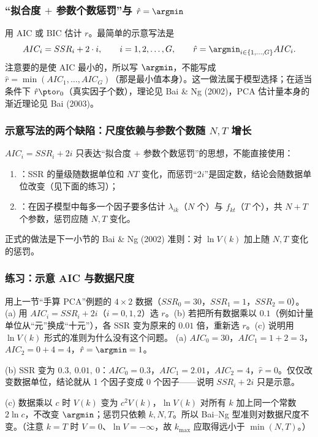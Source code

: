 \subsubsection{“拟合度 \texorpdfstring{$+$}{+} 参数个数惩罚”与 \texorpdfstring{$\hat r=\argmin$}{r-hat = argmin}}

用 AIC 或 BIC 估计 $r$。最简单的示意写法是
\[
AIC_i=SSR_i+2\cdot i,\qquad i=1,2,\dots,G,\qquad
\hat r=\argmin_{i\in\{1,\dots,G\}}AIC_i .
\]
注意要的是使 AIC 最小的，所以写 $\argmin$，不能写成 $\hat r=\min(AIC_1,\dots,AIC_G)$（那是最小值本身）。这一做法属于模型选择；在适当条件下 $\hat r\pto r_0$（真实因子个数），理论见 Bai \& Ng (2002)，PCA 估计量本身的渐近理论见 Bai (2003)。

\subsubsection{示意写法的两个缺陷：尺度依赖与参数个数随 \texorpdfstring{$N,T$}{N,T} 增长}

$AIC_i=SSR_i+2i$ 只表达“拟合度 $+$ 参数个数惩罚”的思想，不能直接使用：
\begin{enumerate}
\item {}：SSR 的量级随数据单位和 $NT$ 变化，而惩罚“$2i$”是固定数，结论会随数据单位改变（见下面的练习）；
\item {}：在因子模型中每多一个因子要多估计 $\lambda_{ik}$（$N$ 个）与 $f_{kt}$（$T$ 个），共 $N+T$ 个参数，惩罚应随 $N,T$ 变化。
\end{enumerate}
正式的做法是下一小节的 Bai \& Ng (2002) 准则：对 $\ln V(k)$ 加上随 $N,T$ 变化的惩罚。

\subsubsection{练习：示意 AIC 与数据尺度}

\begin{prac}\label{pr:U13b-aicscale}
用上一节“手算 PCA”例题的 $4\times2$ 数据（$SSR_0=30$，$SSR_1=1$，$SSR_2=0$）。(a) 用 $AIC_i=SSR_i+2i$（$i=0,1,2$）选 $r$。(b) 若把所有数据乘以 $0.1$（例如计量单位从“元”换成“十元”），各 SSR 变为原来的 $0.01$ 倍，重新选 $r$。(c) 说明用 $\ln V(k)$ 形式的准则为什么没有这个问题。
\answer
(a) $AIC_0=30$，$AIC_1=1+2=3$，$AIC_2=0+4=4$，$\hat r=\argmin=1$。

(b) SSR 变为 $0.3,\ 0.01,\ 0$：$AIC_0=0.3$，$AIC_1=2.01$，$AIC_2=4$，$\hat r=0$。仅仅改变数据单位，结论就从 1 个因子变成 0 个因子——说明 $SSR_i+2i$ 只是示意。

(c) 数据乘以 $c$ 时 $V(k)$ 变为 $c^2V(k)$，$\ln V(k)$ 对所有 $k$ 加上同一个常数 $2\ln c$，不改变 $\argmin$；惩罚只依赖 $k,N,T$。所以 Bai--Ng 型准则对数据尺度不变。（注意 $k=T$ 时 $V=0$、$\ln V=-\infty$，故 $k_{\max}$ 应取得远小于 $\min(N,T)$。）
\end{prac}

